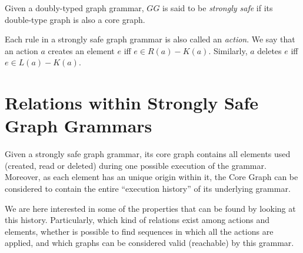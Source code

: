 \begin{definition} Given \doublyTypedGraphGrammarCore{} a doubly-typed graph grammar, $GG$ is said to be \emph{strongly safe} if its double-type graph is also a core graph.

  Each rule in a strongly safe graph grammar is also called an \emph{action}. We say that an action $a$ creates an element $e$ iff $e \in R(a) - K(a)$. Similarly, $a$ deletes $e$ iff \mbox{$e \in L(a) - K(a)$}.
\end{definition}

\begin{example}
\end{example}

\section{Relations within Strongly Safe Graph Grammars}

Given a strongly safe graph grammar, its core graph contains all elements used (created, read or deleted) during one possible execution of the grammar. Moreover, as each element has an unique origin within it, the Core Graph can be considered to contain the entire ``execution history'' of its underlying grammar. 

We are here interested in some of the properties that can be found by looking at this history. Particularly, which kind of relations exist among actions and elements, whether is possible to find sequences in which all the actions are applied, and which graphs can be considered valid (reachable) by this grammar.

